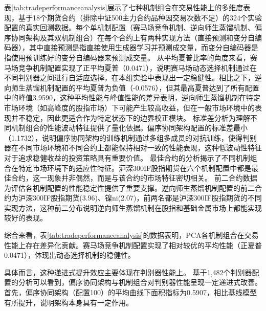 表\ref{tab:tradeperformanceanalysis}展示了七种机制组合在交易性能上的多维度表现，基于18个期货合约（排除中证500主力合约品种因交易次数不足）的324个实验配置的真实回测数据。每个单机制配置（赛马场竞争机制、逆向师生蒸馏机制、偏序协同架构及其双机制组合）在每个合约上有两种实现方法（直接预测和变分自编码器），其中直接预测是指直接使用生成器学习并预测成交量，而变分自编码器是指使用预训练好的变分自编码器来预测成交量。
从平均夏普比率的角度来看，赛马场竞争机制配置实现了正平均夏普（0.0471），说明赛马场动态选择机制通过在不同判别器之间进行自适应选择，在本组实验中表现出一定稳健性。相比之下，逆向师生蒸馏机制配置的平均夏普为负值（-0.0576），但其最高夏普达到了所有配置中的峰值3.9590，这种平均性能与峰值性能的差异表明，逆向师生蒸馏机制在特定市场环境（如高峰度的股指市场）下可能产生较高收益，但在一般市场环境中的表现并不稳定，因此更适合作为特定状态下的边界校正模块。
标准差分析为理解不同机制组合的性能波动特征提供了量化依据。偏序协同架构配置的标准差最小（1.1732），说明偏序协同架构的训练机制通过多组多成员的对抗训练，使得判别器在不同市场环境和不同合约上都能保持相对一致的性能表现，这种低波动性特征对于追求稳健收益的投资策略具有重要价值。
最佳合约的分析揭示了不同机制组合在特定市场环境下的适应性特征。沪深300IF股指期货在六个机制配置中都是最佳合约，这一现象并非偶然，而是与该合约的市场特征密切相关。
前二合约数据为评估各机制配置的性能稳定性提供了重要支撑。逆向师生蒸馏机制配置的前二合约为沪深300IF股指期货(3.96)、镍ni(2.07)，前两名都是沪深300IF股指期货的不同实现方法，这种前二分布说明逆向师生蒸馏机制在股指和基础金属市场上都能实现较好的表现。

综合来看，表\ref{tab:tradeperformanceanalysis}的数据表明，PCA各机制组合在交易性能上存在差异化贡献。赛马场竞争机制配置实现了相对较优的平均性能（正夏普0.0471），体现出动态选择机制的稳健性。
 

具体而言，这种递进式提升效应主要体现在判别器性能上。
基于1,482个判别器配置的分析可以看到，偏序协同架构与机制组合对判别器性能呈现一定递进式改善。首先，偏序协同架构（配置100）的平均曲线下面积指标为0.5907，相比基线模型有所提升，说明架构本身具有一定作用。
 

